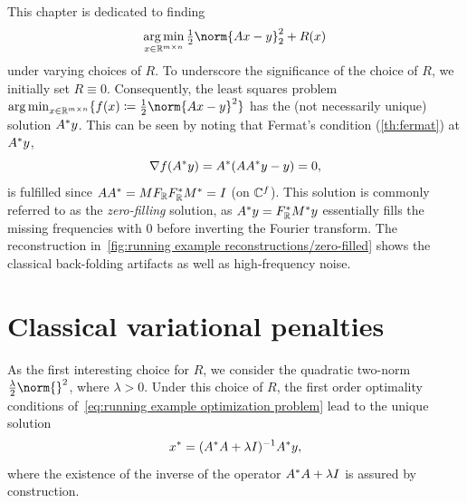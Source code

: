 This chapter is dedicated to finding
\begin{equation}
	\argmin_{x \in \R^{\Height \times \Width}} \Half \norm{\Forward\Signal - \Data}_{\num{2}}^{\num{2}} + R(x)
	\label{eq:running example optimization problem}
\end{equation}
under varying choices of \( R \).
To underscore the significance of the choice of \( R \), we initially set \( R \equiv 0 \).
Consequently, the least squares problem \( \argmin_{x \in \R^{\Height \times \Width}} \{ f(x) \coloneqq \Half \norm{\Forward\Signal - \Data}^{\num{2}} \} \) has the (not necessarily unique) solution \( A^{\ast}y \).
This can be seen by noting that Fermat's condition (\cref{th:fermat}) at \( A^{\ast}y \),
\begin{equation}
	\nabla f(A^{\ast} y) = A^{\ast}(AA^{\ast}y - y) = 0,
\end{equation}
is fulfilled since \( AA^{\ast} = MF_{\mathbb{R}}F_{\mathbb{R}}^{\ast}M^{\ast} = I \) (on \( \mathbb{C}^f \)).
This solution is commonly referred to as the \emph{zero-filling} solution, as \( A^{\ast} y = F_{\mathbb{R}}^{\ast}M^{\ast}y \) essentially fills the missing frequencies with \num{0} before inverting the Fourier transform.
The reconstruction in~\cref{fig:running example reconstructions/zero-filled} shows the classical back-folding artifacts as well as high-frequency noise.

\section{Classical variational penalties}
As the first interesting choice for \( R \), we consider the quadratic two-norm \( \frac{\lambda}{2} \norm{}^{\num{2}} \), where \( \lambda > 0 \).
Under this choice of \( R \), the first order optimality conditions of~\cref{eq:running example optimization problem} lead to the unique solution
\begin{equation}
	{x}^\ast = (A^{\ast} A + \lambda I)^{-1} A^{\ast}y,
\end{equation}
where the existence of the inverse of the operator \( A^{\ast} A + \lambda I \) is assured by construction.

